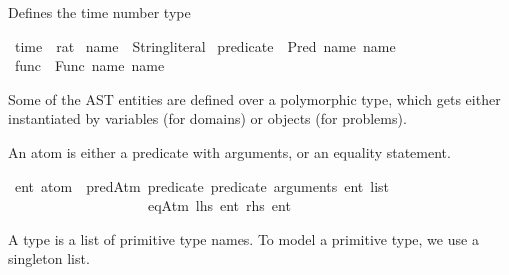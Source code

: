 \begin{isabellebody}
%
\isadelimdocument
%
\endisadelimdocument
%
\isatagdocument
%
\isamarkuptrue%
%
\isamarkuptrue%
%
\endisatagdocument
{\isafolddocument}%
%
\isadelimdocument
%
\endisadelimdocument
%
\begin{isamarkuptext}%
Defines the time number type%
\end{isamarkuptext}\isamarkuptrue%
\isamarkupfalse%
\ time\ {\isacharequal}{\kern0pt}\ rat\isanewline
\isanewline
{}\isamarkupfalse%
\ name\ {\isacharequal}{\kern0pt}\ String{\isachardot}{\kern0pt}literal\isanewline
\isanewline
{}\isamarkupfalse%
\ predicate\ {\isacharequal}{\kern0pt}\ Pred\ {\isacharparenleft}{\kern0pt}name{\isacharcolon}{\kern0pt}\ name{\isacharparenright}{\kern0pt}\isanewline
\isanewline
{}\isamarkupfalse%
\ func\ {\isacharequal}{\kern0pt}\ Func\ {\isacharparenleft}{\kern0pt}name{\isacharcolon}{\kern0pt}\ name{\isacharparenright}{\kern0pt}%
\begin{isamarkuptext}%
Some of the AST entities are defined over a polymorphic  type,
  which gets either instantiated by variables (for domains)
  or objects (for problems).%
\end{isamarkuptext}\isamarkuptrue%
%
\begin{isamarkuptext}%
An atom is either a predicate with arguments, or an equality statement.%
\end{isamarkuptext}\isamarkuptrue%
\isamarkupfalse%
\ {\isacharprime}{\kern0pt}ent\ atom\ {\isacharequal}{\kern0pt}\ predAtm\ {\isacharparenleft}{\kern0pt}predicate{\isacharcolon}{\kern0pt}\ predicate{\isacharparenright}{\kern0pt}\ {\isacharparenleft}{\kern0pt}arguments{\isacharcolon}{\kern0pt}\ {\isachardoublequoteopen}{\isacharprime}{\kern0pt}ent\ list{\isachardoublequoteclose}{\isacharparenright}{\kern0pt}\isanewline
\ \ \ \ \ \ \ \ \ \ \ \ \ \ \ \ \ \ \ {\isacharbar}{\kern0pt}\ eqAtm\ {\isacharparenleft}{\kern0pt}lhs{\isacharcolon}{\kern0pt}\ {\isacharprime}{\kern0pt}ent{\isacharparenright}{\kern0pt}\ {\isacharparenleft}{\kern0pt}rhs{\isacharcolon}{\kern0pt}\ {\isacharprime}{\kern0pt}ent{\isacharparenright}{\kern0pt}%
\begin{isamarkuptext}%
A type is a list of primitive type names.
  To model a primitive type, we use a singleton list.%
\end{isamarkuptext}\isamarkuptrue%

\end{isabellebody}
